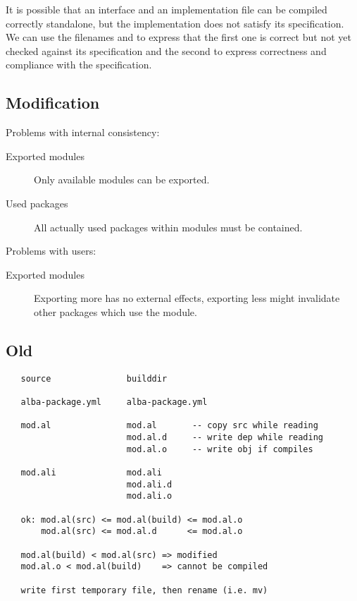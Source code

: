 It is possible that an interface and an implementation file can be compiled
correctly standalone, but the implementation does not satisfy its
specification. We can use the filenames  and   to
express that the first one is correct but not yet checked against its
specification and the second to express correctness and compliance with the
specification.

\subsection{ Modification}


Problems with internal consistency:
\begin{description}

\item[Exported modules] Only available modules can be exported.

\item[Used packages] All actually used packages within modules must be
  contained.

\end{description}


Problems with users:
\begin{description}

\item[Exported modules] Exporting more has no external effects, exporting less
  might invalidate other packages which use the module.

\end{description}


\subsection{Old}

{\small
\begin{verbatim}
   source               builddir

   alba-package.yml     alba-package.yml

   mod.al               mod.al       -- copy src while reading
                        mod.al.d     -- write dep while reading
                        mod.al.o     -- write obj if compiles

   mod.ali              mod.ali
                        mod.ali.d
                        mod.ali.o

   ok: mod.al(src) <= mod.al(build) <= mod.al.o
       mod.al(src) <= mod.al.d      <= mod.al.o

   mod.al(build) < mod.al(src) => modified
   mod.al.o < mod.al(build)    => cannot be compiled

   write first temporary file, then rename (i.e. mv)
\end{verbatim}
}

